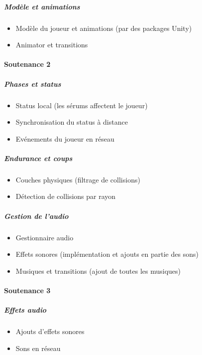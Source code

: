 \documentclass{article}
\begin{document}
\subparagraph{Modèle et animations}

\begin{itemize}
    \item Modèle du joueur et animations (par des packages Unity)
    \item Animator et transitions
\end{itemize}

\paragraph{Soutenance 2}

\subparagraph{Phases et status}

\begin{itemize}
    \item Status local (les sérums affectent le joueur)
    \item Synchronisation du status à distance
    \item Evénements du joueur en réseau
\end{itemize}

\subparagraph{Endurance et coups}

\begin{itemize}
    \item Couches physiques (filtrage de collisions)
    \item Détection de collisions par rayon
\end{itemize}

\subparagraph{Gestion de l'audio}

\begin{itemize}
    \item Gestionnaire audio
    \item Effets sonores (implémentation et ajouts en partie des sons)
    \item Musiques et transitions (ajout de toutes les musiques)
\end{itemize}

\paragraph{Soutenance 3}

\subparagraph{Effets audio}

\begin{itemize}
    \item Ajouts d'effets sonores
    \item Sons en réseau
\end{itemize}
\end{document}
